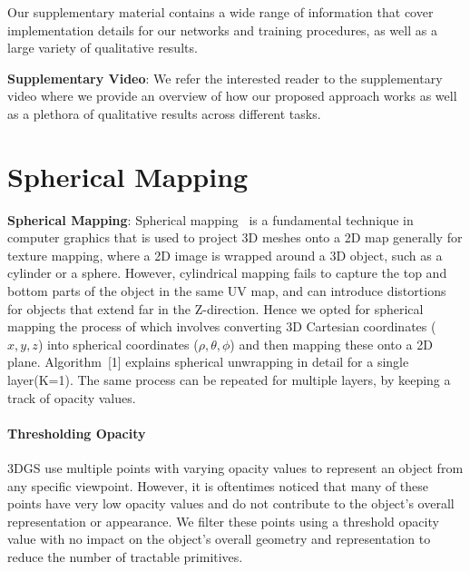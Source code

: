 \maketitlesupplementary
\setcounter{section}{0}
\setcounter{figure}{0}
\noindent Our supplementary material contains a wide range of information that cover implementation details for our networks and training procedures, as well as a large variety of qualitative results. 

\noindent\textbf{Supplementary Video}: We refer the interested reader to the supplementary video where we provide an overview of how our proposed approach works as well as a plethora of qualitative results across different tasks. 

\section{Spherical Mapping}


\noindent\textbf{Spherical Mapping}: 
Spherical mapping~\cite{sphericalmapping2006} is a fundamental technique in computer graphics that is used to project 3D meshes onto a 2D map generally for texture mapping, where a 2D image is wrapped around a 3D object, such as a cylinder or a sphere. 
However, cylindrical mapping fails to capture the top and bottom parts of the object in the same UV map, and can introduce distortions for objects that extend far in the Z-direction. Hence we opted for spherical mapping the process of which involves converting 3D Cartesian coordinates ($x,y,z$) into spherical coordinates ($\rho, \theta, \phi$) and then mapping these onto a 2D plane. Algorithm~[1] explains spherical unwrapping in detail for a single layer(K=1). The same process can be repeated for multiple layers, by keeping a track of opacity values.

\paragraph{Thresholding Opacity} 3DGS use multiple points with varying opacity values to represent an object from any specific viewpoint. 
However, it is oftentimes noticed that many of these points have very low opacity values and do not contribute to the object's overall representation or appearance.
We filter these points using a threshold opacity value with no impact on the object's overall geometry and representation to reduce the number of tractable primitives. 


